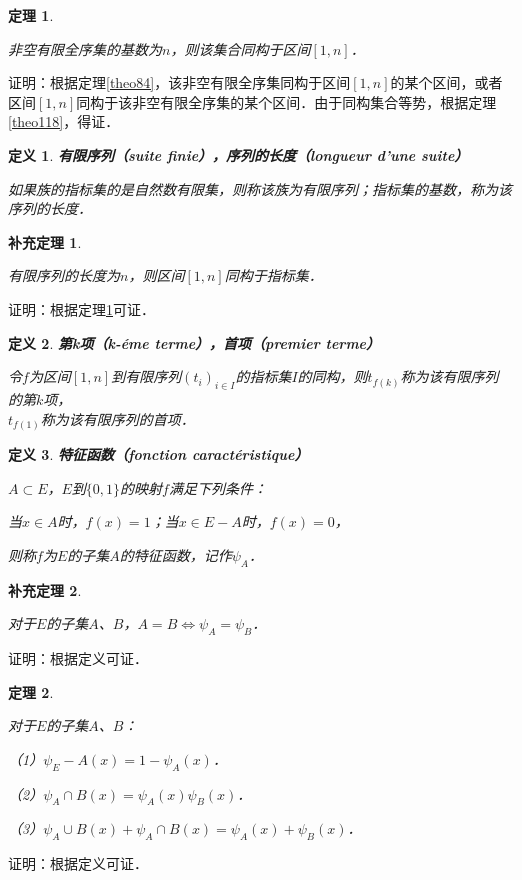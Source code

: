 \documentclass[12pt, a4paper, oneside]{book}
\newtheorem{theo}{定理}
\newtheorem{cor}{补充定理}
\newtheorem{de}{定义}
\begin{document}
			\begin{theo}\label{theo138}
				\hfill\par
				非空有限全序集的基数为$n$，则该集合同构于区间$[1, n]$．
			\end{theo}
			证明：根据定理\ref{theo84}，该非空有限全序集同构于区间$[1, n]$的某个区间，或者区间$[1, n]$同构于该非空有限全序集的某个区间．由于同构集合等势，根据定理\ref{theo118}，得证．
			
			\begin{de}
				\textbf{有限序列（suite finie），序列的长度（longueur d'une suite）}
				\par
				如果族的指标集的是自然数有限集，则称该族为有限序列；指标集的基数，称为该序列的长度．
			\end{de}
			
			\begin{cor}\label{cor313}
				\hfill\par
				有限序列的长度为$n$，则区间$[1, n]$同构于指标集．
			\end{cor}
			证明：根据定理\ref{theo138}可证．
			
			\begin{de}
				\textbf{第k项（k-éme terme），首项（premier terme）}
				\par
				令$f$为区间$[1, n]$到有限序列$(t_i)_{i\in I}$的指标集$I$的同构，则$t_{f(k)}$称为该有限序列的第$k$项，\\$t_{f(1)}$称为该有限序列的首项．
			\end{de}
			
			\begin{de}
				\textbf{特征函数（fonction caractéristique）}
				\par
				$A\subset E$，$E$到$\{0, 1\}$的映射$f$满足下列条件：
				\par
				当$x\in A$时，$f(x)=1$；当$x\in E-A$时，$f(x)=0$，
				\par
				则称$f$为$E$的子集$A$的特征函数，记作$\psi_A$．
			\end{de}
			
			\begin{cor}\label{cor314}
				\hfill\par
				对于$E$的子集$A$、$B$，$A=B\Leftrightarrow \psi_A=\psi_B$．
			\end{cor}
			证明：根据定义可证．
			
			\begin{theo}\label{theo139}
				\hfill\par
				对于$E$的子集$A$、$B$：
				\par
				（1）$\psi_E-A(x)=1-\psi_A(x)$．
				\par
				（2）$\psi_A\cap B(x)=\psi_A(x)\psi_B(x)$．
				\par
				（3）$\psi_A\cup B(x)+\psi_A\cap B(x)= \psi_A(x)+\psi_B(x)$．
			\end{theo}
			证明：根据定义可证．
			
\end{document}
